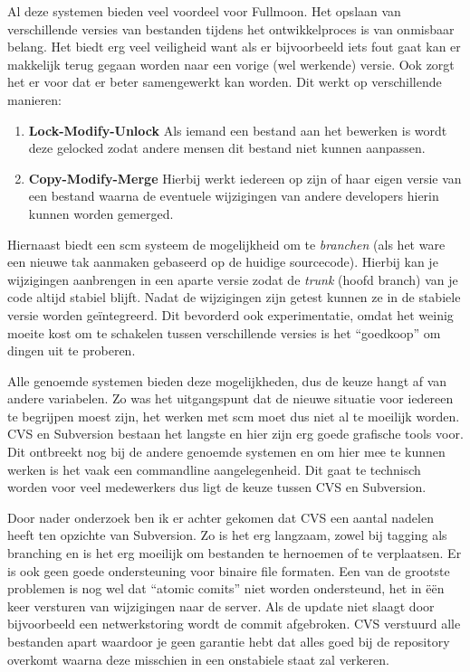 \documentclass[12pt,a4paper]{article}
\begin{document}
    Al deze systemen bieden veel voordeel voor Fullmoon. Het opslaan van verschillende versies van bestanden tijdens het ontwikkelproces is van onmisbaar belang. Het biedt erg veel veiligheid want als er bijvoorbeeld iets fout gaat kan er makkelijk terug gegaan worden naar een vorige (wel werkende) versie. Ook zorgt het er voor dat er beter samengewerkt kan worden. Dit werkt op verschillende manieren:
    
    \begin{enumerate}
      \item \textbf{Lock-Modify-Unlock} Als iemand een bestand aan het bewerken is wordt deze gelocked zodat andere mensen dit bestand niet kunnen aanpassen.
      \item \textbf{Copy-Modify-Merge} Hierbij werkt iedereen op zijn of haar eigen versie van een bestand waarna de eventuele wijzigingen van andere developers hierin kunnen worden gemerged. 
    \end{enumerate}
    
    Hiernaast biedt een {\sc scm} systeem de mogelijkheid om te \emph{branchen} (als het ware een nieuwe tak aanmaken gebaseerd op de huidige sourcecode). Hierbij kan je wijzigingen aanbrengen in een aparte versie zodat de \emph{trunk} (hoofd branch) van je code altijd stabiel blijft. Nadat de wijzigingen zijn getest kunnen ze in de stabiele versie worden ge\"{i}ntegreerd. Dit bevorderd ook experimentatie, omdat het weinig moeite kost om te schakelen tussen verschillende versies is het ``goedkoop'' om dingen uit te proberen.
    
    Alle genoemde systemen bieden deze mogelijkheden, dus de keuze hangt af van andere variabelen. Zo was het uitgangspunt dat de nieuwe situatie voor iedereen te begrijpen moest zijn, het werken met {\sc scm} moet dus niet al te moeilijk worden. CVS en Subversion bestaan het langste en hier zijn erg goede grafische tools voor. Dit ontbreekt nog bij de andere genoemde systemen en om hier mee te kunnen werken is het vaak een commandline aangelegenheid. Dit gaat te technisch worden voor veel medewerkers dus ligt de keuze tussen CVS en Subversion.
    
    Door nader onderzoek ben ik er achter gekomen dat CVS een aantal nadelen heeft ten opzichte van Subversion. Zo is het erg langzaam, zowel bij tagging als branching en is het erg moeilijk om bestanden te hernoemen of te verplaatsen. Er is ook geen goede ondersteuning voor binaire file formaten. Een van de grootste problemen is nog wel dat ``atomic comits'' niet worden ondersteund,  het in \"{e}\"{e}n keer versturen van wijzigingen naar de server. Als de update niet slaagt door bijvoorbeeld een netwerkstoring wordt de commit afgebroken. CVS verstuurd alle bestanden apart waardoor je geen garantie hebt dat alles goed bij de repository overkomt waarna deze misschien in een onstabiele staat zal verkeren.
    
\end{document}
